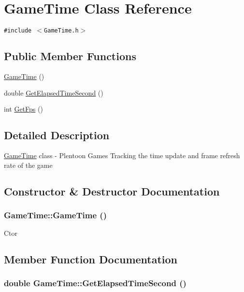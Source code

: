 \hypertarget{class_game_time}{
\section{GameTime Class Reference}
\label{class_game_time}
}
{\tt \#include $<$GameTime.h$>$}

\subsection*{Public Member Functions}
\begin{CompactItemize}
\item 
\hyperlink{class_game_time_b3b7fbfbc2a94e223d349b3dd48f76d3}{GameTime} ()
\item 
double \hyperlink{class_game_time_419d50c60f61ea321be7badcdf070e0e}{GetElapsedTimeSecond} ()
\item 
int \hyperlink{class_game_time_2fd3b8071acff2c5f8f9e18c72914a1b}{GetFps} ()
\end{CompactItemize}


\subsection{Detailed Description}
\hyperlink{class_game_time}{GameTime} class - Plentoon Games Tracking the time update and frame refresh rate of the game 

\subsection{Constructor \& Destructor Documentation}
\hypertarget{class_game_time_b3b7fbfbc2a94e223d349b3dd48f76d3}{
\subsubsection[GameTime]{\setlength{\rightskip}{0pt plus 5cm}GameTime::GameTime ()}}
\label{class_game_time_b3b7fbfbc2a94e223d349b3dd48f76d3}


Ctor 

\subsection{Member Function Documentation}
\hypertarget{class_game_time_419d50c60f61ea321be7badcdf070e0e}{
\subsubsection[GetElapsedTimeSecond]{\setlength{\rightskip}{0pt plus 5cm}double GameTime::GetElapsedTimeSecond ()}}
\label{class_game_time_419d50c60f61ea321be7badcdf070e0e}


